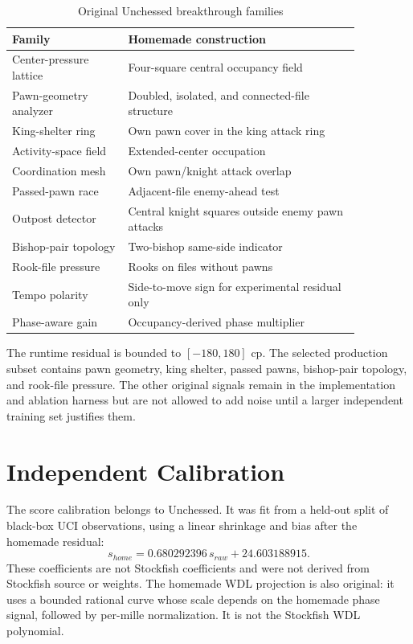 \documentclass[10pt,conference]{IEEEtran}
\begin{document}
\begin{table}[t]
\centering
\caption{Original Unchessed breakthrough families}
\label{tab:features}
\begin{tabular}{p{0.29\linewidth}p{0.57\linewidth}}
\toprule
Family & Homemade construction\\
\midrule
Center-pressure lattice & Four-square central occupancy field\\
Pawn-geometry analyzer & Doubled, isolated, and connected-file structure\\
King-shelter ring & Own pawn cover in the king attack ring\\
Activity-space field & Extended-center occupation\\
Coordination mesh & Own pawn/knight attack overlap\\
Passed-pawn race & Adjacent-file enemy-ahead test\\
Outpost detector & Central knight squares outside enemy pawn attacks\\
Bishop-pair topology & Two-bishop same-side indicator\\
Rook-file pressure & Rooks on files without pawns\\
Tempo polarity & Side-to-move sign for experimental residual only\\
Phase-aware gain & Occupancy-derived phase multiplier\\
\bottomrule
\end{tabular}
\end{table}

The runtime residual is bounded to $[-180,180]$ cp. The selected production subset contains pawn geometry, king shelter, passed pawns, bishop-pair topology, and rook-file pressure. The other original signals remain in the implementation and ablation harness but are not allowed to add noise until a larger independent training set justifies them.

\section{Independent Calibration}
The score calibration belongs to Unchessed. It was fit from a held-out split of black-box UCI observations, using a linear shrinkage and bias after the homemade residual:
\begin{equation}
  s_{home} = 0.680292396\,s_{raw} + 24.603188915.
\end{equation}
These coefficients are not Stockfish coefficients and were not derived from Stockfish source or weights. The homemade WDL projection is also original: it uses a bounded rational curve whose scale depends on the homemade phase signal, followed by per-mille normalization. It is not the Stockfish WDL polynomial.
\end{document}

